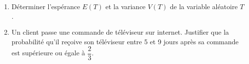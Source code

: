 \begin{enumerate}
	\begin{enumerate}
		\item Déterminer l'espérance $E(T)$ et la variance $V(T)$ de la variable aléatoire $T$.
		\item Un client passe une commande de téléviseur sur internet. Justifier que la probabilité qu'il reçoive son téléviseur entre 5 et 9 jours après sa commande est supérieure ou égale à $\dfrac{2}{3}$.
	\end{enumerate}

\end{enumerate}
\medskip

